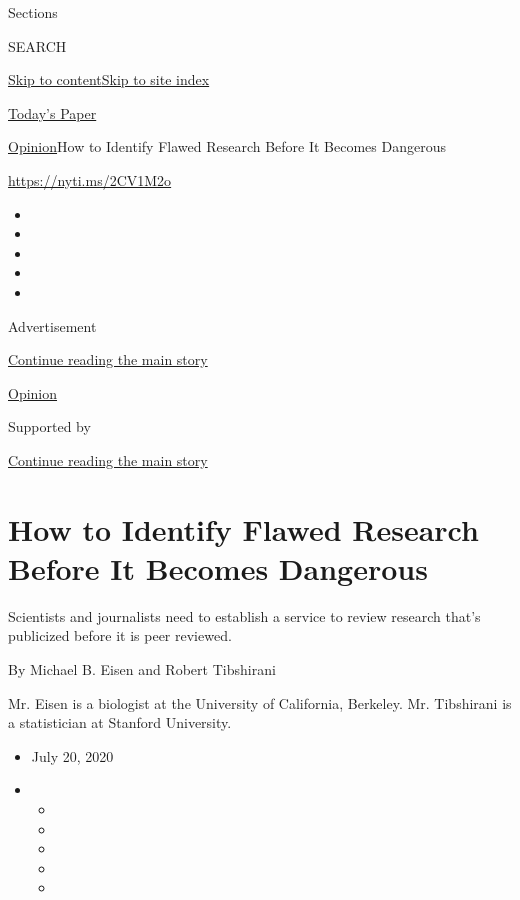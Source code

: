 Sections

SEARCH

\protect\hyperlink{site-content}{Skip to
content}\protect\hyperlink{site-index}{Skip to site index}

\href{https://myaccount.nytimes.com/auth/login?response_type=cookie\&client_id=vi}{}

\href{https://www.nytimes.com/section/todayspaper}{Today's Paper}

\href{/section/opinion}{Opinion}\textbar{}How to Identify Flawed
Research Before It Becomes Dangerous

\href{https://nyti.ms/2CV1M2o}{https://nyti.ms/2CV1M2o}

\begin{itemize}
\item
\item
\item
\item
\item
\end{itemize}

Advertisement

\protect\hyperlink{after-top}{Continue reading the main story}

\href{/section/opinion}{Opinion}

Supported by

\protect\hyperlink{after-sponsor}{Continue reading the main story}

\hypertarget{how-to-identify-flawed-research-before-it-becomes-dangerous}{%
\section{How to Identify Flawed Research Before It Becomes
Dangerous}\label{how-to-identify-flawed-research-before-it-becomes-dangerous}}

Scientists and journalists need to establish a service to review
research that's publicized before it is peer reviewed.

By Michael B. Eisen and Robert Tibshirani

Mr. Eisen is a biologist at the University of California, Berkeley. Mr.
Tibshirani is a statistician at Stanford University.

\begin{itemize}
\item
  July 20, 2020
\item
  \begin{itemize}
  \item
  \item
  \item
  \item
  \item
  \end{itemize}
\end{itemize}

